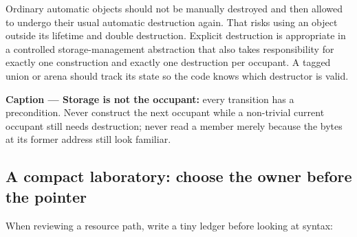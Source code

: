 Ordinary automatic objects should not be manually destroyed and then allowed to undergo their usual automatic destruction again. That risks using an object outside its lifetime and double destruction. Explicit destruction is appropriate in a controlled storage-management abstraction that also takes responsibility for exactly one construction and exactly one destruction per occupant. A tagged union or arena should track its state so the code knows which destructor is valid.


\textbf{Caption --- Storage is not the occupant:} every transition has a precondition. Never construct the next occupant while a non-trivial current occupant still needs destruction; never read a member merely because the bytes at its former address still look familiar.

\subsection{A compact laboratory: choose the owner before the pointer}\label{05-engine-i-ch004-a-compact-laboratory-choose-the-owner-before-the-pointer}

\hypertarget{05-engine-i-ch004-a-compact-laboratory-choose-the-owner-before-the-pointer}{}

When reviewing a resource path, write a tiny ledger before looking at syntax:

